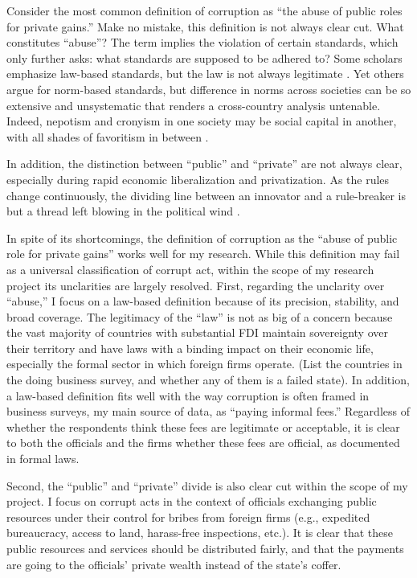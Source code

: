 Consider the most common definition of corruption as ``the abuse of public roles for private gains.'' Make no mistake, this definition is not always clear cut. What constitutes ``abuse''? The term implies the violation of certain standards, which only further asks: what standards are supposed to be adhered to? Some scholars emphasize law-based standards, but the law is not always legitimate \citep[17]{Johnston2004}. Yet others argue for norm-based standards, but difference in norms across societies can be so extensive and unsystematic that renders a cross-country analysis untenable. Indeed, nepotism and cronyism in one society may be social capital in another, with all shades of favoritism in between \citep{Rosen2010}. 

In addition, the distinction between ``public'' and ``private'' are not always clear, especially during rapid economic liberalization and privatization. As the rules change continuously, the dividing line between an innovator and a rule-breaker is but a thread left blowing in the political wind \citep{Sun2004}.

In spite of its shortcomings, the definition of corruption as the ``abuse of public role for private gains'' works well for my research. While this definition may fail as a universal classification of corrupt act, within the scope of my research project its unclarities are largely resolved. First, regarding the unclarity over ``abuse,'' I focus on a law-based definition because of its precision, stability, and broad coverage. The legitimacy of the ``law'' is not as big of a concern because the vast majority of countries with substantial FDI maintain sovereignty over their territory and have laws with a binding impact on their economic life, especially the formal sector in which foreign firms operate. (List the countries in the doing business survey, and whether any of them is a failed state). In addition, a law-based definition fits well with the way corruption is often framed in business surveys, my main source of data, as ``paying informal fees.'' Regardless of whether the respondents think these fees are legitimate or acceptable, it is clear to both the officials and the firms whether these fees are official, as documented in formal laws.

Second, the ``public'' and ``private'' divide is also clear cut within the scope of my project. I focus on corrupt acts in the context of officials exchanging public resources under their control for bribes from foreign firms (e.g., expedited bureaucracy, access to land, harass-free inspections, etc.). It is clear that these public resources and services should be distributed fairly, and that the payments are going to the officials' private wealth instead of the state's coffer.

